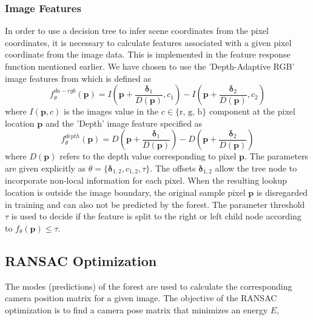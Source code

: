 \documentclass[final]{cvpr}
\begin{document}
\subsubsection{Image Features}
In order to use a decision tree to infer scene coordinates from the pixel coordinates,
it is necessary to calculate features associated with a given pixel coordinate from the
image data. This is implemented in the feature response function mentioned earlier.
We have chosen to use the 'Depth-Adaptive RGB' image features from \cite{shotton2013} which
is defined as
\begin{equation}
	f_{\theta}^{da-rgb}(\boldsymbol{p}) = I\left(\boldsymbol{p} + \frac{\boldsymbol{\delta}_1}{D(\boldsymbol{p})}, c_1\right)
	- I\left(\boldsymbol{p} + \frac{\boldsymbol{\delta}_2}{D(\boldsymbol{p})}, c_2\right)
\end{equation}
where $I(\boldsymbol{p}, c)$ is the images value in the $c \in \{\text{r, g, b}\}$ component at
the pixel location $\boldsymbol{p}$ and the 'Depth' image feature specified as
\begin{equation}
	f_{\theta}^{depth}(\boldsymbol{p}) = D\left(\boldsymbol{p} + \frac{\boldsymbol{\delta}_1}{D(\boldsymbol{p})}\right)
	- D\left(\boldsymbol{p} + \frac{\boldsymbol{\delta}_2}{D(\boldsymbol{p})}\right)
\end{equation}
where $D(\boldsymbol{p})$ refers to the depth value corresponding to pixel $\boldsymbol{p}$.
The parameters are given explicitly as $\theta = \{\boldsymbol{\delta}_{1,2}, c_{1,2}, \tau\}$. 
The offsets $\boldsymbol{\delta}_{1,2}$
allow the tree node to incorporate non-local information for each pixel. When the resulting
lookup location is outside the image boundary, the original sample pixel $\boldsymbol{p}$ is
disregarded in training and can also not be predicted by the forest. The parameter threshold 
$\tau$ is used to decide if the feature is split to the right or left child node according to 
$f_{\theta}(\boldsymbol{p}) \leq \tau$.


\subsection{RANSAC Optimization}
The modes (predictions) of the forest are used to calculate the corresponding camera position matrix for a given image. The objective of the RANSAC optimization is to find a camera pose matrix that minimizes an energy $E$,
\end{document}
